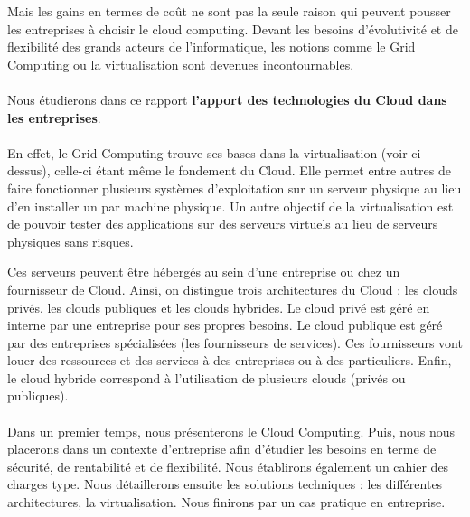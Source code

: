 \documentclass[a4paper,12pt]{report}
\begin{document}
\begin{onehalfspace}
	Mais les gains en termes de coût ne sont pas la seule raison qui peuvent pousser les entreprises à choisir le cloud computing. Devant les besoins d'évolutivité et de flexibilité des grands acteurs de l'informatique, les notions comme le Grid Computing ou la virtualisation sont devenues incontournables.
	
	
	\paragraph*{}
	Nous étudierons dans ce rapport \textbf{l’apport des technologies du Cloud dans les entreprises}.
	
	\paragraph*{}
	En effet, le Grid Computing trouve ses bases dans la virtualisation (voir ci-dessus), celle-ci étant même le fondement du Cloud. Elle permet entre autres de faire fonctionner plusieurs systèmes d’exploitation sur un serveur physique au lieu d’en installer un par machine physique. Un autre objectif de la virtualisation est de pouvoir tester des applications sur des serveurs virtuels au lieu de serveurs physiques sans risques.
	
	Ces serveurs peuvent être hébergés au sein d’une entreprise ou chez un fournisseur de Cloud. Ainsi, on distingue trois architectures du Cloud : les clouds privés, les clouds publiques et les clouds hybrides. Le cloud privé est géré en interne par une entreprise pour ses propres besoins. Le cloud publique est géré par des entreprises spécialisées (les fournisseurs de services). Ces fournisseurs vont louer des ressources et des services à des entreprises ou à des particuliers. Enfin, le cloud hybride correspond à l’utilisation de plusieurs clouds (privés ou publiques).
	
	\paragraph*{}
	Dans un premier temps, nous présenterons le Cloud Computing. Puis, nous nous placerons dans un contexte d’entreprise afin d’étudier les besoins en terme de sécurité, de rentabilité et de flexibilité. Nous établirons également un cahier des charges type. Nous détaillerons ensuite les solutions techniques : les différentes architectures, la virtualisation. Nous finirons par un cas pratique en entreprise.
	

\end{onehalfspace}
\end{document}
